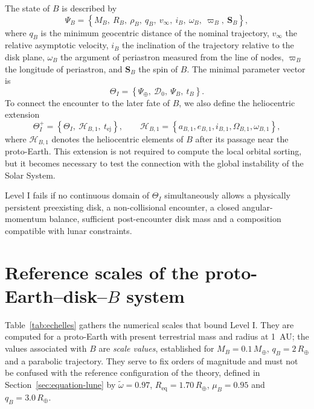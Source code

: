 \documentclass[11pt,a4paper,openany]{report}
\newcommand{\Mt}{M_{\oplus}}
\newcommand{\Rt}{R_{\oplus}}
\newcommand{\Req}{R_{\mathrm{eq}}}
\begin{document}
The state of $B$ is described by
\begin{equation}
\Psi_B=\left\{M_B,\ R_B,\ \rho_B,\ q_B,\ v_\infty,\ i_B,\ \omega_B,\ \varpi_B,\ \mathbf{S}_B\right\},
\label{eq:PsiB}
\end{equation}
where $q_B$ is the minimum geocentric distance of the nominal trajectory, $v_\infty$ the relative
asymptotic velocity, $i_B$ the inclination of the trajectory relative to the disk plane, $\omega_B$
the argument of periastron measured from the line of nodes, $\varpi_B$ the longitude of
periastron, and $\mathbf{S}_B$ the spin of $B$. The minimal parameter vector is
\begin{equation}
\Theta_I=\left\{\Psi_\oplus,\ \mathcal{D}_0,\ \Psi_B,\ t_B\right\}.
\label{eq:Theta}
\end{equation}
To connect the encounter to the later fate of $B$, we also define the heliocentric extension
\begin{equation}
\Theta_I^{+}=\left\{\Theta_I,\ \mathcal{H}_{B,1},\ t_{\mathrm{ej}}\right\},
\qquad
\mathcal{H}_{B,1}=\left\{a_{B,1},e_{B,1},i_{B,1},\Omega_{B,1},\omega_{B,1}\right\},
\label{eq:Theta-plus}
\end{equation}
where $\mathcal{H}_{B,1}$ denotes the heliocentric elements of $B$ after its passage near the
proto-Earth. This extension is not required to compute the local orbital sorting, but it becomes
necessary to test the connection with the global instability of the Solar System.

\begin{falsif}
Level I fails if no continuous domain of $\Theta_I$ simultaneously allows a physically persistent
preexisting disk, a non-collisional encounter, a closed angular-momentum balance, sufficient
post-encounter disk mass and a composition compatible with lunar constraints.
\end{falsif}

\section{Reference scales of the proto-Earth--disk--\texorpdfstring{$B$}{B} system}

Table~\ref{tab:echelles} gathers the numerical scales that bound Level I. They are computed for a
proto-Earth with present terrestrial mass and radius at 1~AU; the values associated with $B$ are
\emph{scale values}, established for $M_B=0.1\,\Mt$, $q_B=2\,\Rt$ and a parabolic trajectory. They
serve to fix orders of magnitude and must not be confused with the reference configuration of the
theory, defined in Section~\ref{sec:equation-lune} by $\tilde\omega=0.97$, $\Req=1.70\,\Rt$,
$\mu_B=0.95$ and $q_B=3.0\,\Rt$.
\end{document}
